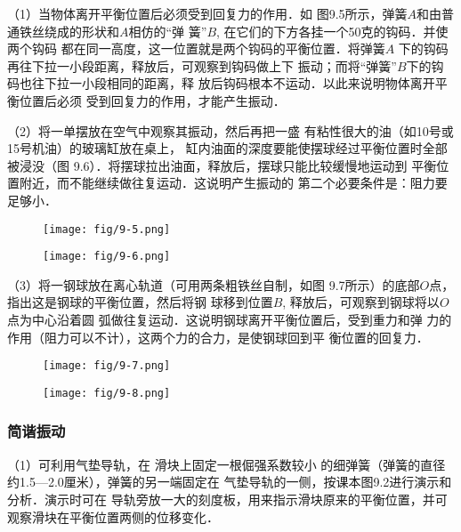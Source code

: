 （1）当物体离开平衡位置后必须受到回复力的作用．如
图9.5所示，弹簧$A$和由普通铁丝绕成的形状和$A$相仿的“弹
簧”$B$, 在它们的下方各挂一个50克的钩码．并使两个钩码
都在同一高度，这一位置就是两个钩码的平衡位置．将弹簧$A$
下的钩码再往下拉一小段距离，释放后，可观察到钩码做上下
振动；而将“弹簧”$B$下的钩码也往下拉一小段相同的距离，释
放后钩码根本不运动．以此来说明物体离开平衡位置后必须
受到回复力的作用，才能产生振动．

（2）将一单摆放在空气中观察其振动，然后再把一盛
有粘性很大的油（如10号或15号机油）的玻璃缸放在桌上，
缸内油面的深度要能使摆球经过平衡位置时全部被浸没（图
9.6）．将摆球拉出油面，释放后，摆球只能比较缓慢地运动到
平衡位置附近，而不能继续做往复运动．这说明产生振动的
第二个必要条件是：阻力要足够小．

\begin{figure}[htp]\centering
    \begin{minipage}[t]{0.48\textwidth}
    \centering
\texttt{[image: fig/9-5.png]}
    \caption{}
    \end{minipage}
    \begin{minipage}[t]{0.48\textwidth}
    \centering
\texttt{[image: fig/9-6.png]}
    \caption{}
    \end{minipage}
    \end{figure}

    （3）将一钢球放在离心轨道（可用两条粗铁丝自制，如图
9.7所示）的底部$O$点，指出这是钢球的平衡位置，然后将钢
球移到位置$B$, 释放后，可观察到钢球将以$O$点为中心沿着圆
弧做往复运动．这说明钢球离开平衡位置后，受到重力和弹
力的作用（阻力可以不计），这两个力的合力，是使钢球回到平
衡位置的回复力．

\begin{figure}[htp]\centering
    \begin{minipage}[t]{0.48\textwidth}
    \centering
\texttt{[image: fig/9-7.png]}
    \caption{}
    \end{minipage}
    \begin{minipage}[t]{0.48\textwidth}
    \centering
\texttt{[image: fig/9-8.png]}
    \caption{}
    \end{minipage}
    \end{figure}

\subsubsection{简谐振动}
（1）可利用气垫导轨，在
滑块上固定一根倔强系数较小
的细弹簧（弹簧的直径约1.5—2.0厘米），弹簧的另一端固定在
气垫导轨的一侧，按课本图9.2进行演示和分析．演示时可在
导轨旁放一大的刻度板，用来指示滑块原来的平衡位置，并可
观察滑块在平衡位置两侧的位移变化．

